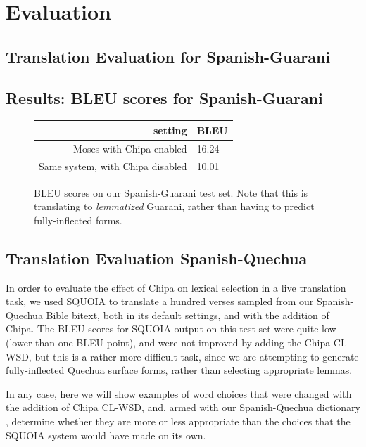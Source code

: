 \section{Evaluation}

\subsection{Translation Evaluation for Spanish-Guarani}


\subsection{Results: BLEU scores for Spanish-Guarani}
\begin{figure}
  \begin{centering}
  \begin{tabulary}{\textwidth}{|R|L|}
    \hline
    setting & BLEU \\
    \hline
    Moses with Chipa enabled &  16.24 \\
    \hline
    Same system, with Chipa disabled &  10.01 \\
    \hline
  \end{tabulary}
  \end{centering}
  \caption{BLEU scores on our Spanish-Guarani test set. Note that this is
  translating to \emph{lemmatized} Guarani, rather than having to predict
  fully-inflected forms.}
  \label{fig:pyramid-extras-results}
\end{figure}


\subsection{Translation Evaluation Spanish-Quechua}

In order to evaluate the effect of Chipa on lexical selection in a live
translation task, we used SQUOIA to translate a hundred verses sampled from our
Spanish-Quechua Bible bitext, both in its default settings, and with the
addition of Chipa. The BLEU scores for SQUOIA output on this test set were
quite low (lower than one BLEU point), and were not improved by adding the
Chipa CL-WSD, but this is a rather more difficult task, since we are attempting
to generate fully-inflected Quechua surface forms, rather than selecting
appropriate lemmas.

In any case, here we will show examples of word choices that were changed with
the addition of Chipa CL-WSD, and, armed with our Spanish-Quechua dictionary
\cite{academiamayor}, determine whether they are more or less appropriate than
the choices that the SQUOIA system would have made on its own.
